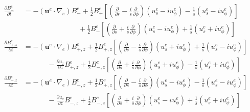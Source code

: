 \begin{align*}
    \frac{\partial B_{-}^e}{\partial t} &= - \left(\mathbf{u}^e \cdot \nabla_e\right) B_{-}^e + \frac{1}{2} B_{+}^e \left[\left(\frac{\partial}{\partial s} - \frac{i}{s}\frac{\partial}{\partial \phi}\right) \left(u_{s}^e - iu_{\phi}^e\right) - \frac{1}{s} \left(u_{s}^e - i u_{\phi}^e\right)\right] \\ 
    &\qquad \qquad \qquad \quad \,\,\,\, + \frac{1}{2} B_{-}^e \left[\left(\frac{\partial}{\partial s} + \frac{i}{s}\frac{\partial}{\partial \phi}\right) \left(u_{s}^e - iu_{\phi}^e\right) + \frac{1}{s} \left(u_{s}^e + i u_{\phi}^e\right)\right] \\ 
    \frac{\partial B_{+,z}^e}{\partial t} &= - \left(\mathbf{u}^e \cdot \nabla_e\right) B_{+,z}^e + \frac{1}{2} B_{+,z}^e \left[\left(\frac{\partial}{\partial s} - \frac{i}{s}\frac{\partial}{\partial \phi}\right) \left(u_{s}^e + iu_{\phi}^e\right) + \frac{1}{s} \left(u_{s}^e - i u_{\phi}^e\right)\right] \\ 
    &\qquad \quad \,\, - \frac{\partial u_z}{\partial z} B_{+,z}^e + \frac{1}{2} B_{-,z}^e \left[\left(\frac{\partial}{\partial s} + \frac{i}{s}\frac{\partial}{\partial \phi}\right) \left(u_{s}^e + iu_{\phi}^e\right) - \frac{1}{s} \left(u_{s}^e + i u_{\phi}^e\right)\right] \\ 
    \frac{\partial B_{-,z}^e}{\partial t} &= - \left(\mathbf{u}^e \cdot \nabla_e\right) B_{-,z}^e + \frac{1}{2} B_{+,z}^e \left[\left(\frac{\partial}{\partial s} - \frac{i}{s}\frac{\partial}{\partial \phi}\right) \left(u_{s}^e - iu_{\phi}^e\right) - \frac{1}{s} \left(u_{s}^e - i u_{\phi}^e\right)\right] \\ 
    &\qquad \quad \,\, - \frac{\partial u_z}{\partial z} B_{-,z}^e + \frac{1}{2} B_{-,z}^e \left[\left(\frac{\partial}{\partial s} + \frac{i}{s}\frac{\partial}{\partial \phi}\right) \left(u_{s}^e - iu_{\phi}^e\right) + \frac{1}{s} \left(u_{s}^e + i u_{\phi}^e\right)\right]
\end{align*}


